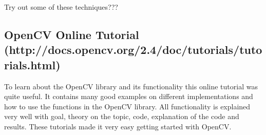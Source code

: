 {\color{red}Try out some of these techniques???}


\subsection{OpenCV Online Tutorial \\
(http://docs.opencv.org/2.4/doc/tutorials/tutorials.html)}
To learn about the OpenCV library and its functionality this online tutorial was quite useful. It contains many good examples on different implementations and how to use the functions in the OpenCV library. All functionality is explained very well with goal, theory on the topic, code, explanation of the code and results. These tutorials made it very easy getting started with OpenCV.
